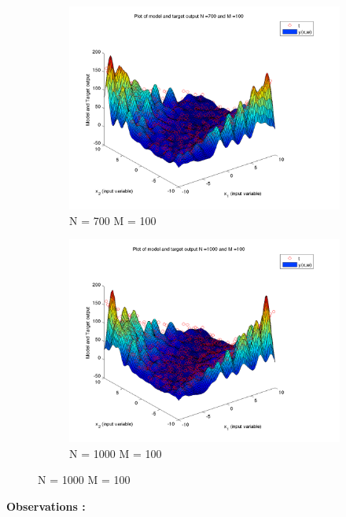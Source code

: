 \documentclass{article}
\begin{document}
\begin{figure}[H]
\begin{subfigure}{.5\textwidth}
\centering
\includegraphics[width=\linewidth]{D2/VaryingN_N700M100}
\caption{N = 700 M = 100}
\end{subfigure}
\begin{subfigure}{.5\textwidth}
\includegraphics[width=\linewidth]{D2/VaryingN_N1000M100}
\caption{N = 1000 M = 100}
\end{subfigure}



\end{figure}


\textbf{Observations :}
\end{document}
